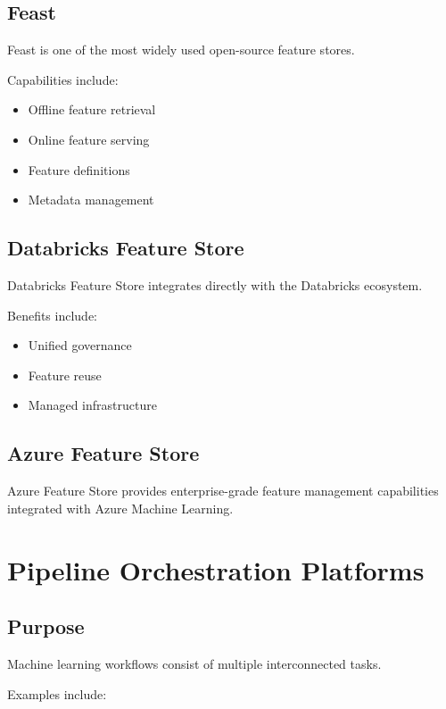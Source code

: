 \subsection{Feast}

Feast is one of the most widely used open-source feature stores.

Capabilities include:

\begin{itemize}
    \item Offline feature retrieval
    \item Online feature serving
    \item Feature definitions
    \item Metadata management
\end{itemize}

\subsection{Databricks Feature Store}

Databricks Feature Store integrates directly with the Databricks ecosystem.

Benefits include:

\begin{itemize}
    \item Unified governance
    \item Feature reuse
    \item Managed infrastructure
\end{itemize}

\subsection{Azure Feature Store}

Azure Feature Store provides enterprise-grade feature management capabilities integrated with Azure Machine Learning.

\section{Pipeline Orchestration Platforms}

\subsection{Purpose}

Machine learning workflows consist of multiple interconnected tasks.

Examples include:

